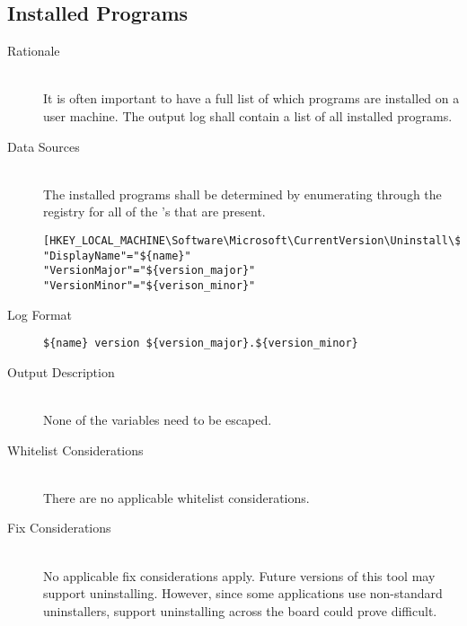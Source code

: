 \subsection{Installed Programs}
\begin{description}
\item[Rationale] \hfill \\
It is often important to have a full list of which programs are installed on a
user machine.  The output log shall contain a list of all installed programs.  
\item[Data Sources] \hfill \\
The installed programs shall be determined by enumerating through the registry
for all of the 's that are present.
\vspace{-\baselineskip}
\begin{verbatim}
[HKEY_LOCAL_MACHINE\Software\Microsoft\CurrentVersion\Uninstall\${id}]
"DisplayName"="${name}"
"VersionMajor"="${version_major}"
"VersionMinor"="${verison_minor}"
\end{verbatim}
\item[Log Format] \hfill 
\vspace{-\baselineskip}
\begin{verbatim}
${name} version ${version_major}.${version_minor}
\end{verbatim}
\item[Output Description] \hfill \\
None of the variables need to be escaped.
\item[Whitelist Considerations] \hfill \\
There are no applicable whitelist considerations.
\item[Fix Considerations] \hfill \\
No applicable fix considerations apply.  Future versions of this tool may
support uninstalling.  However, since some applications use non-standard
uninstallers, support uninstalling across the board could prove difficult.
\end{description}